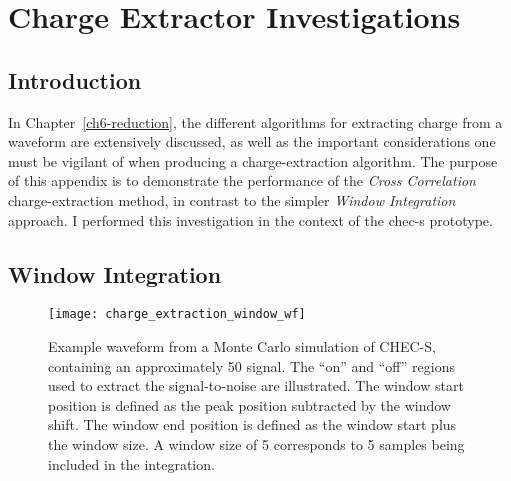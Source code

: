 \chapter{\label{a5-extractors}Charge Extractor Investigations}

\minitoc

\section{Introduction}

In Chapter~\ref{ch6-reduction}, the different algorithms for extracting charge from a waveform are extensively discussed, as well as the important considerations one must be vigilant of when producing a charge-extraction algorithm. The purpose of this appendix is to demonstrate the performance of the \textit{Cross Correlation} charge-extraction method, in contrast to the simpler \textit{Window Integration} approach. I performed this investigation in the context of the \gls{chec-s} prototype.

\section{Window Integration}

\begin{figure}
  \texttt{[image: charge\_extraction\_window\_wf]}
  \caption[Definition of integration window on a waveform.]{Example waveform from a Monte Carlo simulation of CHEC-S, containing an approximately \SI{50}{\pe} signal. The ``on'' and ``off'' regions used to extract the signal-to-noise are illustrated. The window start position is defined as the peak position subtracted by the window shift. The window end position is defined as the window start plus the window size. A window size of 5 corresponds to 5 samples being included in the integration.}
  \label{fig:charge_extraction_window_wf}
\end{figure}

